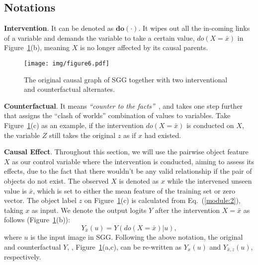 \documentclass[10pt,twocolumn,letterpaper]{article}
\begin{document}
\vspace{-0.05in}
\subsection{Notations}
\vspace{-0.05in}
\noindent\textbf{Intervention}. It can be denoted as $\bm {do(\cdot)}$. It wipes out all the in-coming links of a variable and demands the variable to take a certain value, \eg $do(X=\bar{x})$ in Figure~\ref{fig:counterfactual}(b), meaning $X$ is no longer affected by its causal parents. 

\begin{figure}[t]
   \begin{minipage}[b]{1.0\linewidth}
   \centerline{\texttt{[image: img/figure6.pdf]}}
   \end{minipage}
   \caption{The original causal graph of SGG together with two interventional and counterfactual alternates.}
   \label{fig:counterfactual} \vspace{-0.2in}
\end{figure}

\noindent\textbf{Counterfactual}. It means \textit{``counter to the facts''}~\cite{roese1997counterfactual}, and takes one step further that assigns the ``clash of worlds'' combination of values to variables. Take Figure~\ref{fig:counterfactual}(c) as an example, if the intervention $do(X=\bar{x})$ is conducted on $X$, the variable $Z$ still takes the original $z$ as if $x$ had existed.



\noindent\textbf{Causal Effect}. Throughout this section, we will use the pairwise object feature $X$ as our control variable where the intervention is conducted, aiming to assess its effects, due to the fact that there wouldn't be any valid relationship if the pair of objects do not exist. The observed $X$ is denoted as $x$ while the intervened unseen value is $\bar{x}$, which is set to either the mean feature of the training set or zero vector. The object label $z$ on Figure~\ref{fig:counterfactual}(c) is calculated from Eq.~(\ref{module:2}), taking $x$ as input. We denote the output logits $Y$ after the intervention $X=\bar{x}$ as follows (Figure~\ref{fig:counterfactual}(b)):
\begin{equation}
    Y_{\bar{x}}(u)=Y(do(X=\bar{x})|u),
\end{equation}
where $u$ is the input image in SGG. Following the above notation, the original and counterfactual $Y$, \ie, Figure~\ref{fig:counterfactual}(a,c), can be  re-written as $Y_x(u)$ and $Y_{\bar{x},z}(u)$, respectively.
\end{document}

